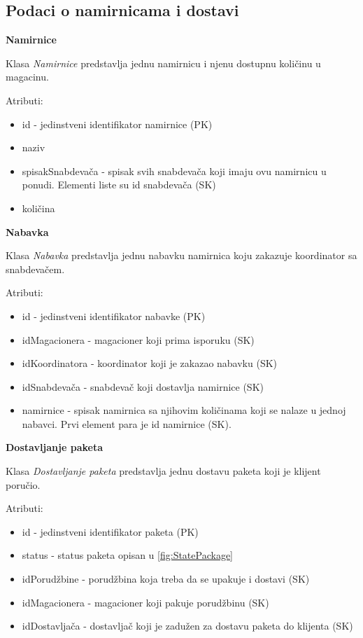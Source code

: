 \subsection{Podaci o namirnicama i dostavi}

\textbf{\large Namirnice}
\vspace{0.3cm}

Klasa \textit{Namirnice} predstavlja jednu namirnicu i njenu dostupnu količinu u magacinu.

Atributi:
\begin{itemize}
    \item id - jedinstveni identifikator namirnice (PK)
    \item naziv 
    \item spisakSnabdevača - spisak svih snabdevača koji imaju ovu namirnicu u ponudi. Elementi liste su id snabdevača (SK)
    \item količina
\end{itemize}

\textbf{\large Nabavka}
\vspace{0.3cm}

Klasa \textit{Nabavka} predstavlja jednu nabavku namirnica koju zakazuje koordinator sa snabdevačem.

Atributi:
\begin{itemize}
    \item id - jedinstveni identifikator nabavke (PK)
    \item idMagacionera - magacioner koji prima isporuku (SK)
    \item idKoordinatora - koordinator koji je zakazao nabavku (SK)
    \item idSnabdevača - snabdevač koji dostavlja namirnice (SK)
    \item namirnice - spisak namirnica sa njihovim količinama koji se nalaze u jednoj nabavci. Prvi element para je id namirnice  (SK).
\end{itemize}

\textbf{\large Dostavljanje paketa}
\vspace{0.3cm}

Klasa \textit{Dostavljanje paketa} predstavlja jednu dostavu paketa  koji je klijent poručio.

Atributi:
\begin{itemize}
    \item id - jedinstveni identifikator paketa (PK)
    \item status - status paketa opisan u \ref{fig:StatePackage}
    \item idPorudžbine - porudžbina koja treba da se upakuje i dostavi (SK)
    \item idMagacionera - magacioner koji pakuje porudžbinu (SK)
    \item idDostavljača - dostavljač koji je zadužen za dostavu paketa do klijenta (SK)
\end{itemize}